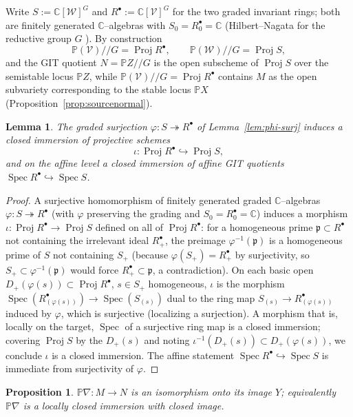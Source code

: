 \documentclass{amsart}
\newtheorem{lemma}{Lemma}
\newtheorem{proposition}{Proposition}
\theoremstyle{definition}
\DeclareMathOperator{\Spec}{Spec}
\DeclareMathOperator{\Proj}{Proj}
\newcommand{\PP}{\mathbb{P}}
\newcommand{\CC}{\mathbb{C}}
\newcommand{\nab}{\nabla}
\begin{document}
Write $S:=\CC[\mathcal W]^{G}$ and $R^{\bullet}:=\CC[\mathcal V]^{G}$ for the two graded
invariant rings; both are finitely generated $\CC$--algebras with $S_0=R^{\bullet}_0=\CC$
(Hilbert--Nagata for the reductive group $G$ \cite[Ch.~1, \S 2]{MFK}). By construction
\[
\PP(\mathcal V)/\!/G=\Proj R^{\bullet},\qquad \PP(\mathcal W)/\!/G=\Proj S,
\]
and the GIT quotient $N=\PP Z/\!/G$ is the open subscheme of $\Proj S$ over the semistable
locus $\PP Z$, while $\PP(\mathcal V)/\!/G=\Proj R^{\bullet}$ contains $M$ as the open
subvariety corresponding to the stable locus $\PP X$ (Proposition~\ref{prop:sourcenormal}).

\begin{lemma}\label{lem:closedimm}
The graded surjection $\varphi\colon S\twoheadrightarrow R^{\bullet}$ of
Lemma~\ref{lem:phi-surj} induces a closed immersion of projective schemes
\[
\iota\colon \Proj R^{\bullet}\hookrightarrow \Proj S ,
\]
and on the affine level a closed immersion of affine GIT quotients
$\Spec R^{\bullet}\hookrightarrow\Spec S$.
\end{lemma}

\begin{proof}
A surjective homomorphism of finitely generated graded $\CC$--algebras
$\varphi\colon S\twoheadrightarrow R^{\bullet}$ (with $\varphi$ preserving the grading and
$S_0=R^{\bullet}_0=\CC$) induces a morphism $\iota\colon\Proj R^{\bullet}\to\Proj S$ defined
on all of $\Proj R^{\bullet}$: for a homogeneous prime $\mathfrak p\subset R^{\bullet}$ not
containing the irrelevant ideal $R^{\bullet}_{+}$, the preimage $\varphi^{-1}(\mathfrak p)$ is
a homogeneous prime of $S$ not containing $S_{+}$ (because $\varphi(S_{+})=R^{\bullet}_{+}$ by
surjectivity, so $S_{+}\subset\varphi^{-1}(\mathfrak p)$ would force
$R^{\bullet}_{+}\subset\mathfrak p$, a contradiction). On each basic open
$D_{+}(\varphi(s))\subset\Proj R^{\bullet}$, $s\in S_{+}$ homogeneous, $\iota$ is the morphism
$\Spec(R^{\bullet}_{(\varphi(s))})\to\Spec(S_{(s)})$ dual to the ring map
$S_{(s)}\to R^{\bullet}_{(\varphi(s))}$ induced by $\varphi$, which is surjective (localizing a
surjection). A morphism that is, locally on the target, $\Spec$ of a surjective ring map is a
closed immersion; covering $\Proj S$ by the $D_{+}(s)$ and noting $\iota^{-1}(D_{+}(s))\subset
D_{+}(\varphi(s))$, we conclude $\iota$ is a closed immersion. The affine statement
$\Spec R^{\bullet}\hookrightarrow\Spec S$ is immediate from surjectivity of $\varphi$.
\end{proof}

\begin{proposition}\label{prop:iso-onto-image}
$\PP\nab\colon M\to N$ is an isomorphism onto its image $Y$; equivalently $\PP\nab$ is a
locally closed immersion with closed image.
\end{proposition}
\end{document}
